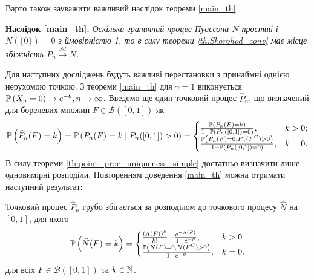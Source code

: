 Варто також зауважити важливий наслідок теореми \ref{main_th}.

\vspace{10pt}
\noindent
\textbf{Наслідок \ref{main_th}.}
\textit{Оскільки граничний процес Пуассона $N$ простий і $N\left(\{0\}\right) = 0$ з ймовірністю 1, то в силу теореми
\ref{th:Skorohod_conv} має місце збіжність $P_n \overset{Sd}{\longrightarrow} N$.}
\vspace{10pt}

Для наступних досліджень будуть важливі перестановки з принаймні однією нерухомою точкою.
З теореми \ref{main_th} для $\gamma = 1$ виконується $\P{X_n = 0} \to e^{-\theta}, n \to \infty$. 
Введемо ще один точковий процес $\widehat{P}_n$, що визначений для борелевих множин $F \in \mathcal{B}([0, 1])$ як 
\begin{gather}
    \P{\widehat{P}_n (F) = k} = \P{P_n(F) = k \mid P_n([0, 1]) > 0} = \begin{cases}
        \frac{\P{P_n(F) = k}}{1 - \P{P_n([0, 1]) = 0}}, & k > 0; \\
        \frac{\P{P_n(F) = 0, P_n(F^C) > 0}}{1 - \P{P_n([0, 1]) = 0}}, & k = 0.
    \end{cases} 
\end{gather}
В силу теореми \ref{th:point_proc_uniqueness_simple} достатньо визначити лише одновимірні розподіли.
Повторенням доведення \ref{main_th} можна отримати наступний результат:
\begin{theorem}\label{cond_th}
    Точковий процес $\widehat{P}_n$ грубо збігається за розподілом до точкового процесу $\widehat{N}$ на $[0, 1]$, 
    для якого
    \begin{gather}\label{Pn_cond_def}
        \P{\widehat{N} (F) = k} =
        \begin{cases}
            \frac{(\Lambda(F))^k}{k!} \cdot \frac{e^{-\Lambda(F)}}{1 - e^{-\theta}}, & k > 0 \\
            \frac{\P{N(F) = 0, N(F^C) > 0}}{1 - e^{-\theta}}, & k = 0.
        \end{cases}
    \end{gather}
    для всіх $F \in \mathcal{B}([0, 1])$ та $k \in \N$.
\end{theorem}
